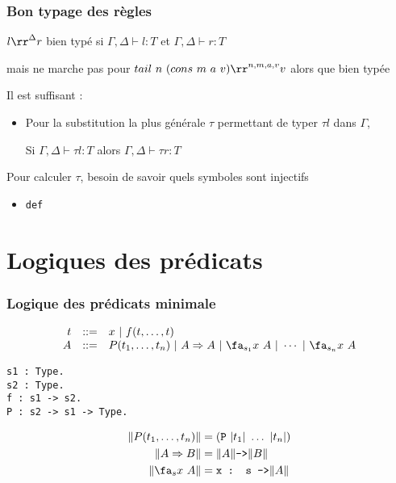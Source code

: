 \documentclass[12pt,aspectratio=169]{beamer}
\begin{document}
\begin{frame}[fragile]
  \frametitle{Bon typage des règles}
$l\rr^\Delta r$ bien typé si $\Gamma,\Delta\vdash l : T$ et
  $\Gamma,\Delta \vdash r : T$
\medskip
  
  mais ne marche pas pour
  $tail~n~(cons~m~a~v)\rr^{n,m,a,v}v$ alors que bien typée
  \medskip
  
  Il est suffisant :
  \begin{itemize}
  \item Pour la substitution la plus générale $\tau$ permettant de typer
    $\tau l$ dans $\Gamma$,

    Si $\Gamma,\Delta\vdash \tau l:T$ alors $\Gamma,\Delta\vdash \tau
    r : T$
  \end{itemize}
  Pour calculer $\tau$, besoin de savoir quels symboles sont injectifs
  \begin{itemize}
  \item \lstinline!def!
  \end{itemize}
\end{frame}

\section{Logiques des prédicats}

\begin{frame}[fragile]
  \frametitle{Logique des prédicats minimale}

 $$
  \begin{array}{r@{~~~::=~~~}l}
    t & x~|~f(t,\ldots,t)\\
  A&P(t_1, \ldots, t_n)~|~A \Rightarrow
  A~|~\fa_{s_1} x~A~|~\cdots~|~\fa_{s_n} x~A
  \end{array}
  $$
  \pause

\begin{lstlisting}
s1 : Type.
s2 : Type.
f : s1 -> s2.
P : s2 -> s1 -> Type.
\end{lstlisting}
  
\begin{align*}
\|P(t_1,\ldots,t_n)\| &= (\texttt{P}~|t_1|~\ldots~|t_n|)\\
\|A \Rightarrow B\| &= \|A\| \texttt{->} \|B\|\\
\|\fa_s x~A\| &= \texttt{x : s ->} \|A\|
\end{align*}

\end{frame}
\end{document}
